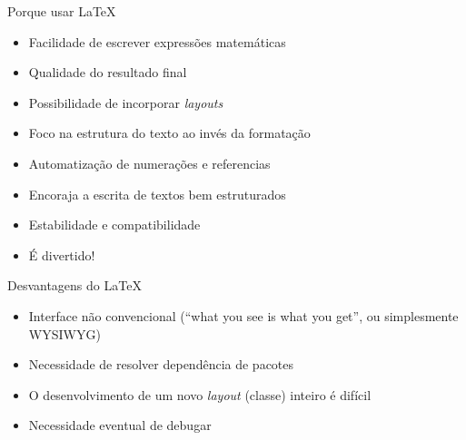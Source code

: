 \documentclass[english,brazil,notheorems]{beamer}
\theoremstyle{definition}
\begin{document}
\begin{frame}{Porque usar \LaTeX}

  \begin{itemize}
  \item Facilidade de escrever expressões matemáticas
  \pause
  \item Qualidade do resultado final
  \pause
  \item Possibilidade de incorporar \emph{layouts}
  \pause
  \item Foco na estrutura do texto ao invés da formatação
  \pause
  \item Automatização de numerações e referencias
  \pause
  \item Encoraja a escrita de textos bem estruturados
  \pause
  \item Estabilidade e compatibilidade
  \pause
  \item É divertido! \smiley
  \end{itemize}

\end{frame}

\begin{frame}{Desvantagens do \LaTeX}
  \begin{itemize}
  \item Interface não convencional (“what you see is what you get”, ou simplesmente WYSIWYG)
  \pause
  \item Necessidade de resolver dependência de pacotes
  \pause
  \item O desenvolvimento de um novo \emph{layout} (classe) inteiro é difícil
  \pause
  \item Necessidade eventual de debugar \frownie
  \end{itemize}
\end{frame}

% 
\end{document}
